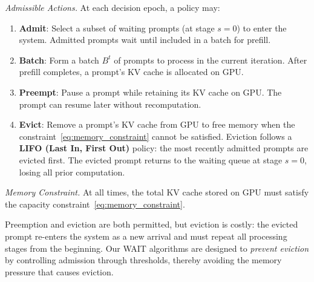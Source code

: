 \textit{Admissible Actions.} At each decision epoch, a policy may:
\begin{enumerate}
    \item \textbf{Admit}: Select a subset of waiting prompts (at stage $s=0$) to enter the system. Admitted prompts wait until included in a batch for prefill.
    \item \textbf{Batch}: Form a batch $B^t$ of prompts to process in the current iteration. After prefill completes, a prompt's KV cache is allocated on GPU.
    \item \textbf{Preempt}: Pause a prompt while retaining its KV cache on GPU. The prompt can resume later without recomputation.
    \item \textbf{Evict}: Remove a prompt's KV cache from GPU to free memory when the constraint~\eqref{eq:memory_constraint} cannot be satisfied. Eviction follows a \textbf{LIFO (Last In, First Out)} policy: the most recently admitted prompts are evicted first. The evicted prompt returns to the waiting queue at stage $s=0$, losing all prior computation.
\end{enumerate}

\textit{Memory Constraint.} At all times, the total KV cache stored on GPU must satisfy the capacity constraint~\eqref{eq:memory_constraint}.

Preemption and eviction are both permitted, but eviction is costly: the evicted prompt re-enters the system as a new arrival and must repeat all processing stages from the beginning. Our WAIT algorithms are designed to \textit{prevent eviction} by controlling admission through thresholds, thereby avoiding the memory pressure that causes eviction. 


